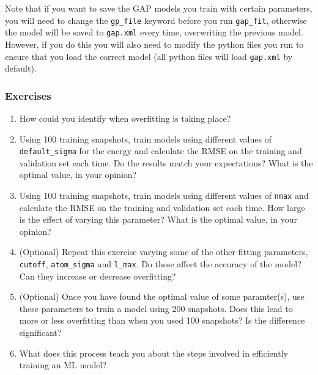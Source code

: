 \documentclass{article}
\begin{document}
Note that if you want to save the GAP models you train with certain parameters, you will need to change the \verb|gp_file| keyword before you run \verb|gap_fit|, otherwise the model will be saved to \verb|gap.xml| every time, overwriting the previous model. However, if you do this you will also need to modify the python files you run to ensure that you load the correct model (all python files will load \verb|gap.xml| by default).

\subsubsection*{Exercises}

\begin{enumerate}
\item How could you identify when overfitting is taking place?
\item Using 100 training snapshots, train models using different values of \verb|default_sigma| for the energy and calculate the RMSE on the training and validation set each time. Do the results match your expectations? What is the optimal value, in your opinion?
\item Using 100 training snapshots, train models using different values of \verb|nmax| and calculate the RMSE on the training and validation set each time. How large is the effect of varying this parameter? What is the optimal value, in your opinion?
\item (Optional) Repeat this exercise varying some of the other fitting parameters, \verb|cutoff|, \verb|atom_sigma| and \verb|l_max|. Do these affect the accuracy of the model? Can they increase or decrease overfitting?
\item (Optional) Once you have found the optimal value of some paramter(s), use these parameters to train a model using 200 snapshots. Does this lead to more or less overfitting than when you used 100 snapshots? Is the difference significant?
\item What does this process teach you about the steps involved in efficiently training an ML model?

\end{enumerate}


\end{document}
